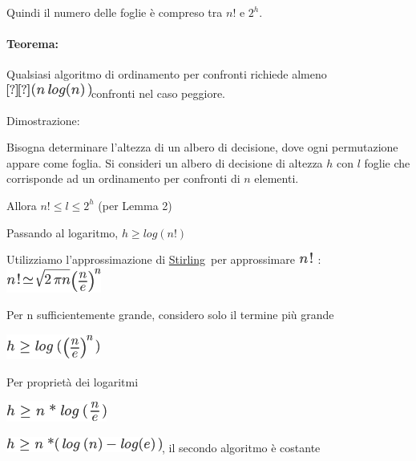 \documentclass{article}
\let\oldparagraph\paragraph
\renewcommand{\paragraph}[1]{\oldparagraph{#1}\mbox{}}
\begin{document}
{{Quindi il numero delle foglie è compreso tra $n!$ e $2^h$.}



\hypertarget{h.hr66c3ikhdcj}{\paragraph{\texorpdfstring{{Teorema:}}{Teorema:}}\label{h.hr66c3ikhdcj}}

{Qualsiasi algoritmo di ordinamento per confronti richiede almeno
}\includegraphics{images/image153.png}{confronti nel caso peggiore.}

{Dimostrazione:}

{Bisogna determinare l'altezza di un albero di decisione, dove ogni permutazione appare come foglia. Si consideri un albero di decisione di altezza $h$ con $l$ foglie che corrisponde ad un ordinamento per confronti di $n$ elementi. }

{Allora $n! \leq l \leq 2^h$ (per Lemma 2)}

{Passando al logaritmo, $h \geq log(n!)$}

{Utilizziamo l'approssimazione di
}{\href{https://www.google.com/url?q=https://it.wikipedia.org/wiki/Approssimazione_di_Stirling\&sa=D\&ust=1523379128517000}{Stirling}}{~per
approssimare }\includegraphics{images/image160.png}{~:
}\includegraphics{images/image175.png}{~}

{Per n sufficientemente grande, considero solo il termine più grande}

\includegraphics{images/image176.png}

{Per proprietà dei logaritmi}

\includegraphics{images/image177.png}

\includegraphics{images/image178.png}{, il secondo algoritmo è costante}

}
\end{document}
